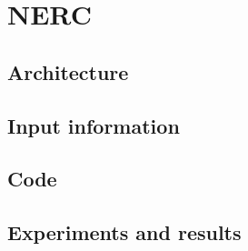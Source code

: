 
\section{NERC}%
\label{sec:nerc}

\subsection{Architecture}%
\label{sub:nerc-arch}

\subsection{Input information}%
\label{sub:nerc-input}

\subsection{Code}%
\label{sub:nerc-code}

\subsection{Experiments and results}%
\label{sub:nerc-experiments}
